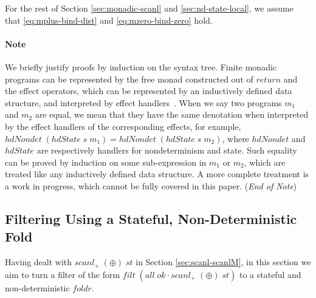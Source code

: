 \documentclass{llncs}
\newcommand{\Varid}[1]{\mathit{#1}}
\let\Varid\mathit
\begin{document}
For the rest of Section \ref{sec:monadic-scanl} and \ref{sec:nd-state-local}, we assume that \eqref{eq:mplus-bind-dist} and \eqref{eq:mzero-bind-zero} hold.

\paragraph{Note} We briefly justify proofs by induction on the syntax tree.
Finite monadic programs can be represented by the free monad constructed out of \ensuremath{\Varid{return}} and the effect operators, which can be represented by an inductively defined data structure, and interpreted by effect handlers~\cite{Kiselyov:13:Extensible,KiselyovIshii:15:Freer}.
When we say two programs \ensuremath{\Varid{m}_{1}} and \ensuremath{\Varid{m}_{2}} are equal, we mean that they have the same denotation when interpreted by the effect handlers of the corresponding effects, for example, \ensuremath{\Varid{hdNondet}\;(\Varid{hdState}\;\Varid{s}\;\Varid{m}_{1})\mathrel{=}\Varid{hdNondet}\;(\Varid{hdState}\;\Varid{s}\;\Varid{m}_{2})}, where \ensuremath{\Varid{hdNondet}} and \ensuremath{\Varid{hdState}} are respectively handlers for nondeterminism and state.
Such equality can be proved by induction on some sub-expression in \ensuremath{\Varid{m}_{1}} or \ensuremath{\Varid{m}_{2}}, which are treated like any inductively defined data structure.
A more complete treatment is a work in progress, which cannot be fully covered in this paper.
({\em End of Note})



\subsection{Filtering Using a Stateful, Non-Deterministic Fold}
\label{sec:monadic-state-passing-local}

Having dealt with \ensuremath{\Varid{scanl}_{+}\;(\oplus)\;\Varid{st}} in Section \ref{sec:scanl-scanlM},
in this section we aim to turn a filter of the form \ensuremath{\Varid{filt}\;(\Varid{all}\;\Varid{ok}\mathbin{\cdot}\Varid{scanl}_{+}\;(\oplus)\;\Varid{st})} to a stateful and non-deterministic \ensuremath{\Varid{foldr}}.
\end{document}
